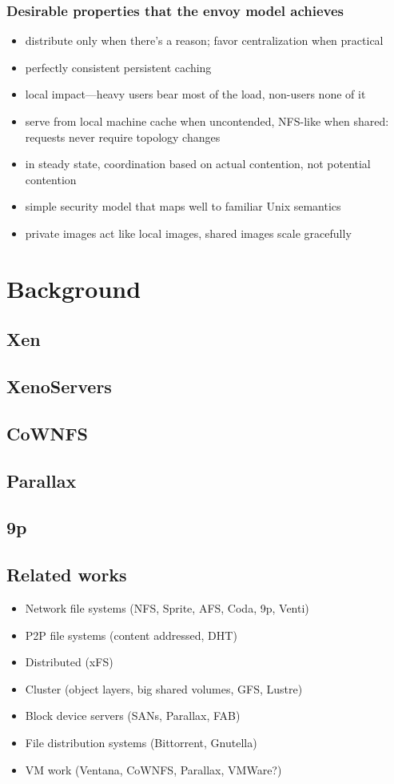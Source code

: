 \documentclass[a4paper]{article}
\begin{document}
\subsubsection{Desirable properties that the envoy model achieves}
\begin{itemize}
\item distribute only when there's a reason; favor centralization when practical
\item perfectly consistent persistent caching
\item local impact---heavy users bear most of the load, non-users none of it
\item serve from local machine cache when uncontended, NFS-like when shared: requests never require topology changes
\item in steady state, coordination based on actual contention, not potential contention
\item simple security model that maps well to familiar Unix semantics
\item private images act like local images, shared images scale gracefully
\end{itemize}


\section{Background}

\subsection{Xen}
\subsection{XenoServers}
\subsection{CoWNFS}
\subsection{Parallax}
\subsection{9p}
\subsection{Related works}
\begin{itemize}
\item Network file systems (NFS, Sprite, AFS, Coda, 9p, Venti)
\item P2P file systems (content addressed, DHT)
\item Distributed (xFS)
\item Cluster (object layers, big shared volumes, GFS, Lustre)
\item Block device servers (SANs, Parallax, FAB)
\item File distribution systems (Bittorrent, Gnutella)
\item VM work (Ventana, CoWNFS, Parallax, VMWare?)
\end{itemize}
\end{document}
